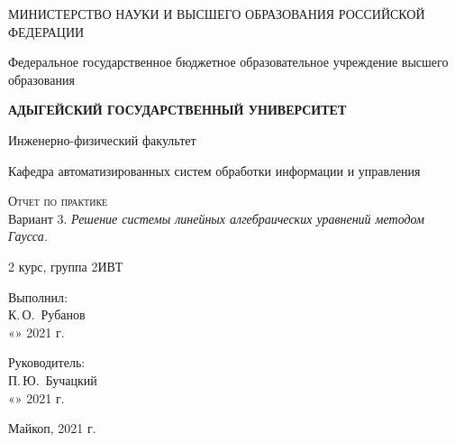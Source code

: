 \documentclass[12pt,a4paper]{scrartcl}
\begin{document}
	\begin{titlepage}
		\begin{center}
			\large
			МИНИСТЕРСТВО НАУКИ И ВЫСШЕГО ОБРАЗОВАНИЯ РОССИЙСКОЙ ФЕДЕРАЦИИ
			
			Федеральное государственное бюджетное образовательное учреждение высшего образования
			
			\textbf{АДЫГЕЙСКИЙ ГОСУДАРСТВЕННЫЙ УНИВЕРСИТЕТ}
			\vspace{0.25cm}
			
			Инженерно-физический факультет
			
			Кафедра автоматизированных систем обработки информации и управления
			\vfill

			\vfill
			
			\textsc{Отчет по практике}\\[5mm]
			
			{\LARGE Вариант 3. \textit{Решение системы линейных алгебраических уравнений методом Гаусса.}}
			\bigskip
			
			2 курс, группа 2ИВТ
		\end{center}
		\vfill
		
		\newlength{\ML}
		\hfill\begin{minipage}{0.5\textwidth}
			Выполнил:\\
			\underline{\hspace{\ML}} К.\,О.~Рубанов\\
			«\underline{\hspace{0.7cm}}» \underline{\hspace{2cm}} 2021 г.
		\end{minipage}%
		\bigskip
		
		\hfill\begin{minipage}{0.5\textwidth}
			Руководитель:\\
			\underline{\hspace{\ML}} П.\,Ю.~Бучацкий \\
			«\underline{\hspace{0.7cm}}» \underline{\hspace{2cm}} 2021 г.
		\end{minipage}%
		\vfill
		
		\begin{center}
			Майкоп, 2021 г.
		\end{center}
	\end{titlepage}
\end{document}

